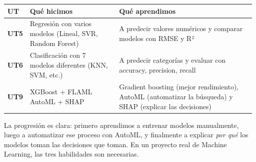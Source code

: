 \documentclass[11pt]{article}
\begin{document}
{\def\LTcaptype{none} %
\begin{longtable}[]{@{}
  >{\raggedright\arraybackslash}p{}
  >{\raggedright\arraybackslash}p{}
  >{\raggedright\arraybackslash}p{}@{}}
\toprule\noalign{}
\begin{minipage}[b]{\linewidth}\raggedright
UT
\end{minipage} & \begin{minipage}[b]{\linewidth}\raggedright
Qué hicimos
\end{minipage} & \begin{minipage}[b]{\linewidth}\raggedright
Qué aprendimos
\end{minipage} \\
\midrule\noalign{}
\endhead
\bottomrule\noalign{}
\endlastfoot
\textbf{UT5} & Regresión con varios modelos (Lineal, SVR, Random Forest)
& A predecir valores numéricos y comparar modelos con RMSE y R² \\
\textbf{UT6} & Clasificación con 7 modelos diferentes (KNN, SVM, etc.) &
A predecir categorías y evaluar con accuracy, precision, recall \\
\textbf{UT9} & XGBoost + FLAML AutoML + SHAP & Gradient boosting (mejor
rendimiento), AutoML (automatizar la búsqueda) y SHAP (explicar las
decisiones) \\
\end{longtable}
}

La progresión es clara: primero aprendimos a entrenar modelos
manualmente, luego a automatizar ese proceso con AutoML, y finalmente a
explicar \emph{por qué} los modelos toman las decisiones que toman. En
un proyecto real de Machine Learning, las tres habilidades son
necesarias.


    
    
    
\end{document}
